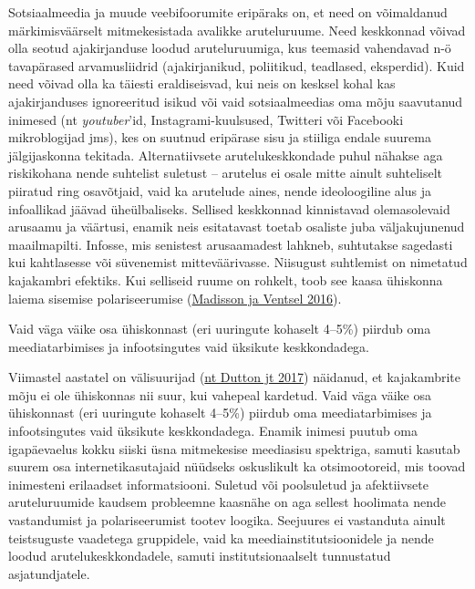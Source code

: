 \documentclass[estonian,]{article}
\begin{document}
Sotsiaalmeedia ja muude veebifoorumite eripäraks on, et need on võimaldanud märkimisväärselt mitmekesistada avalikke aruteluruume. Need keskkonnad võivad olla seotud ajakirjanduse loodud aruteluruumiga, kus teemasid vahendavad n-ö tavapärased arvamusliidrid (ajakirjanikud, poliitikud, teadlased, eksperdid). Kuid need võivad olla ka täiesti eraldiseisvad, kui neis on kesksel kohal kas ajakirjanduses ignoreeritud isikud või vaid sotsiaalmeedias oma mõju saavutanud inimesed (nt \emph{youtuber}'id, Instagrami-kuulsused, Twitteri või Facebooki mikroblogijad jms), kes on suutnud eripärase sisu ja stiiliga endale suurema jälgijaskonna tekitada. Alternatiivsete arutelukeskkondade puhul nähakse aga riskikohana nende suhtelist suletust -- arutelus ei osale mitte ainult suhteliselt piiratud ring osavõtjaid, vaid ka arutelude aines, nende ideoloogiline alus ja infoallikad jäävad üheülbaliseks. Sellised keskkonnad kinnistavad olemasolevaid arusaamu ja väärtusi, enamik neis esitatavast toetab osaliste juba väljakujunenud maailmapilti. Infosse, mis senistest arusaamadest lahkneb, suhtutakse sagedasti kui kahtlasesse või süvenemist mitteväärivasse. Niisugust suhtlemist on nimetatud kajakambri efektiks. Kui selliseid ruume on rohkelt, toob see kaasa ühiskonna laiema sisemise polariseerumise (\protect\hyperlink{Madisson2016}{Madisson ja Ventsel 2016}).

\begin{blockquote-right}
Vaid väga väike osa ühiskonnast (eri uuringute kohaselt 4--5\%) piirdub
oma meediatarbimises ja infootsingutes vaid üksikute keskkondadega.
\end{blockquote-right}

Viimastel aastatel on välisuurijad (\protect\hyperlink{Dutton2017}{nt Dutton jt 2017}) näidanud, et kajakambrite mõju ei ole ühiskonnas nii suur, kui vahepeal kardetud. Vaid väga väike osa ühiskonnast (eri uuringute kohaselt 4--5\%) piirdub oma meediatarbimises ja infootsingutes vaid üksikute keskkondadega. Enamik inimesi puutub oma igapäevaelus kokku siiski üsna mitmekesise meediasisu spektriga, samuti kasutab suurem osa internetikasutajaid nüüdseks oskuslikult ka otsimootoreid, mis toovad inimesteni erilaadset informatsiooni. Suletud või poolsuletud ja afektiivsete aruteluruumide kaudsem probleemne kaasnähe on aga sellest hoolimata nende vastandumist ja polariseerumist tootev loogika. Seejuures ei vastanduta ainult teistsuguste vaadetega gruppidele, vaid ka meediainstitutsioonidele ja nende loodud arutelukeskkondadele, samuti institutsionaalselt tunnustatud asjatundjatele.
\end{document}

